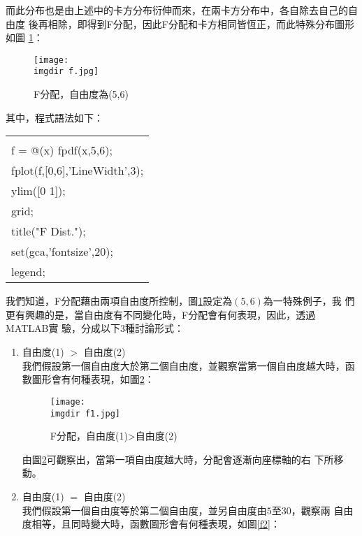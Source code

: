 \begin{enumerate}
{					而此分布也是由上述中的卡方分布衍伸而來，在兩卡方分布中，各自除去自己的自由度						後再相除，即得到F分配，因此F分配和卡方相同皆恆正，而此特殊分布圖形如圖							\ref{f}：
					\begin{figure}[H]	
		 		 		\centering	 			 	 
   				 		\texttt{[image: \\imgdir f.jpg]} 
   			 			\caption{F分配，自由度為(5,6)}   		
   			 			\label{f}   			 		 
					\end{figure}
					其中，程式語法如下：
					\begin{center}\colorbox{slight}{
						\begin{tabular}{p{}}
							\MJHmarker{\textbf{\color{darkblue}{MATLAB語法 :}}}\\		
							f = @(x) fpdf(x,5,6);\\
							fplot(f,[0,6],'LineWidth',3);\\
							ylim([0 1]);\\
							grid;  \\
							title("F Dist.");\\
							set(gca,'fontsize',20); \\
							legend;    \\
						\end{tabular}
					}
					\end{center}
					\bigskip
					我們知道，F分配藉由兩項自由度所控制，圖\ref{f}設定為$(5,6)$為一特殊例子，我						們更有興趣的是，當自由度有不同變化時，F分配會有何表現，因此，透過MATLAB實							驗，分成以下3種討論形式：
					\begin{enumerate}
						\item{自由度(1) $>$ 自由度(2)\\
							我們假設第一個自由度大於第二個自由度，並觀察當第一個自由度越大時，函								數圖形會有何種表現，如圖\ref{f1}：
							\begin{figure}[H]	
		 		 				\centering	 			 	 
   				 				\texttt{[image: \\imgdir f1.jpg]} 
   			 					\caption{F分配，自由度(1)>自由度(2)}   		
   			 					\label{f1}   			 		 
							\end{figure}
							由圖\ref{f1}可觀察出，當第一項自由度越大時，分配會逐漸向座標軸的右								下所移動。							
						}
						\item{自由度(1) $=$ 自由度(2)\\
							我們假設第一個自由度等於第二個自由度，並另自由度由$5$至$30$，觀察兩								自由度相等，且同時變大時，函數圖形會有何種表現，如圖\ref{f2}：
							\begin{figure}[H]	
		 		 				\centering	 			 	 

\end{figure}}
\end{enumerate}}
\end{enumerate}
